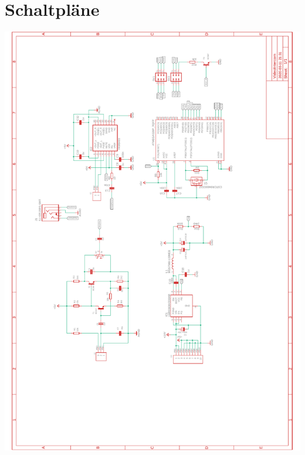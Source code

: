 \documentclass[a4paper, twoside, 12pt, openright]{memoir}
\begin{document}
\section{Schaltpläne}
\includegraphics[width=15.5cm]{images/appendix/schematics.pdf}
\end{document}
